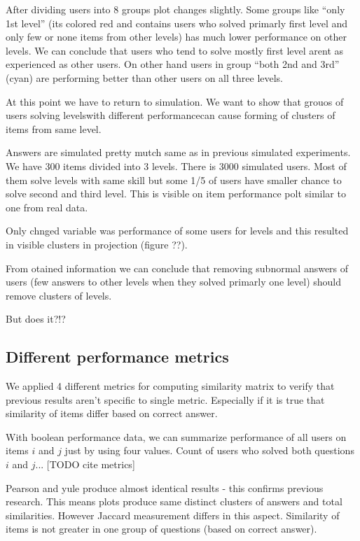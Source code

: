 \documentclass[
  digital, %
  table,   %
  nolof,     %
  nolot,     %
  nocover
]{fithesis3}
\begin{document}
After dividing users into 8 groups plot changes slightly. Some groups
like ``only 1st level'' (its colored red and contains users who solved
primarly first level and only few or none items from other levels) has
much lower performance on other levels. We can conclude that users who
tend to solve mostly first level arent as experienced as other users. On
other hand users in group ``both 2nd and 3rd'' (cyan) are performing
better than other users on all three levels.

At this point we have to return to simulation. We want to show that
grouos of users solving levelswith different performancecan cause
forming of clusters of items from same level.

Answers are simulated pretty mutch same as in previous simulated
experiments. We have 300 items divided into 3 levels. There is 3000
simulated users. Most of them solve levels with same skill but some 1/5
of users have smaller chance to solve second and third level. This is
visible on item performance polt similar to one from real data.

Only chnged variable was performance of some users for levels and this
resulted in visible clusters in projection (figure ??).

From otained information we can conclude that removing subnormal answers
of users (few answers to other levels when they solved primarly one
level) should remove clusters of levels.

But does it?!?

\subsection{Different performance
metrics}\label{different-performance-metrics}


We applied 4 different metrics for computing similarity matrix to verify
that previous results aren't specific to single metric. Especially if it
is true that similarity of items differ based on correct answer.


With boolean performance data, we can summarize performance of all users on items $i$ and $j$ just by using four values. Count of users who solved both questions $i$ and $j$... [TODO cite metrics]

Pearson and yule produce almost identical results - this confirms
previous research. This means plots produce same distinct clusters of
answers and total similarities. However Jaccard measurement differs in
this aspect. Similarity of items is not greater in one group of
questions (based on correct answer).
\end{document}
